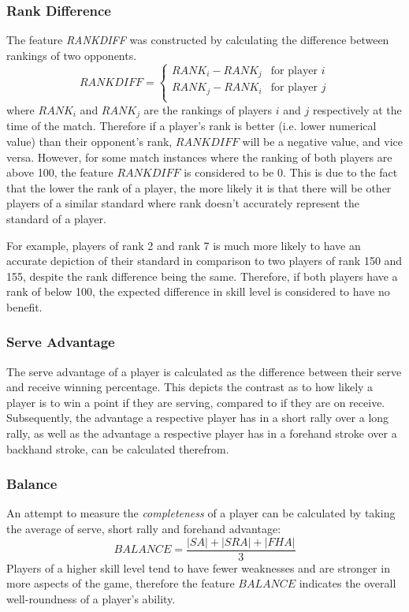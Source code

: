 \subsubsection{Rank Difference} \label{rankdiff}

The feature \textit{RANKDIFF} was constructed by calculating the difference between rankings of two opponents.
$$
RANKDIFF = \begin{cases}
RANK_i - RANK_j &\text{for player $i$} \\
RANK_j - RANK_i &\text{for player $j$} \\
\end{cases}
$$
where $RANK_i$ and $RANK_j$ are the rankings of players $i$ and $j$ respectively at the time of the match. Therefore if a player's rank is better (i.e. lower numerical value) than their opponent's rank, $RANKDIFF$ will be a negative value, and vice versa. However, for some match instances where the ranking of both players are above 100, the feature $RANKDIFF$ is considered to be 0. This is due to the fact that the lower the rank of a player, the more likely it is that there will be other players of a similar standard where rank doesn't accurately represent the standard of a player.

For example, players of rank 2 and rank 7 is much more likely to have an accurate depiction of their standard in comparison to two players of rank 150 and 155, despite the rank difference being the same. Therefore, if both players have a rank of below 100, the expected difference in skill level is considered to have no benefit.

\subsubsection{Serve Advantage} \label{advantage}
The serve advantage of a player is calculated as the difference between their serve and receive winning percentage. This depicts the contrast as to how likely a player is to win a point if they are serving, compared to if they are on receive. Subsequently, the advantage a respective player has in a short rally over a long rally, as well as the advantage a respective player has in a forehand stroke over a backhand stroke, can be calculated therefrom.

\subsubsection{Balance} \label{balance}
An attempt to measure the \textit{completeness} of a player can be calculated by taking the average of serve, short rally and forehand advantage:
$$
BALANCE = \frac{|SA|+|SRA|+|FHA|}{3}
$$
Players of a higher skill level tend to have fewer weaknesses and are stronger in more aspects of the game, therefore the feature $BALANCE$ indicates the overall well-roundness of a player's ability. \label{engineer}

